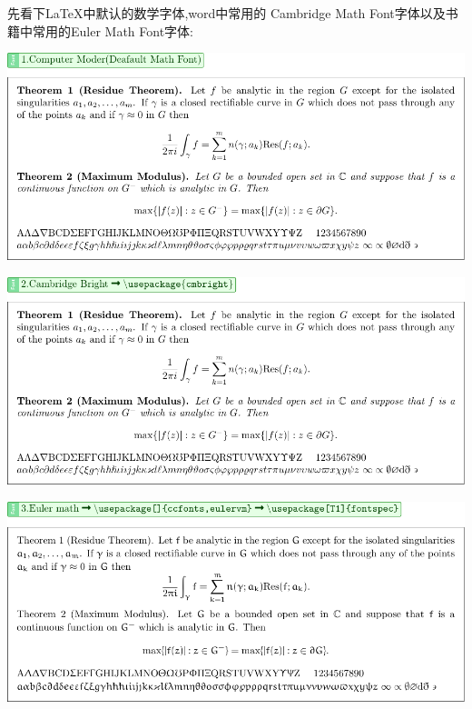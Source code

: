 \documentclass[12pt]{article}
\begin{document}
\; 先看下{\ttfamily \LaTeX}中默认的数学字体,word中常用的
Cambridge Math Font字体以及书籍中常用的Euler Math Font字体:

\begin{center}
    \includegraphics[width=.95\linewidth]{./MathFontVision/Computer-Modern.pdf} 

    \vspace*{2em}
    \includegraphics[width=.95\linewidth]{./MathFontVision/CmBright.pdf} 

    \vspace*{2em}
    \includegraphics[width=.95\linewidth]{./MathFontVision/Euler-Math-Font.pdf} 
\end{center}
\end{document}

